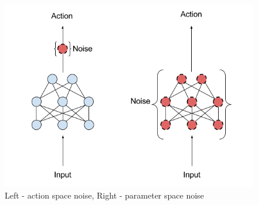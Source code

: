 \begin{figure}[H]
\centering
\includegraphics[scale=0.5]{fig/perturbations.png}
\caption{Left - action space noise, Right - parameter space noise}
\label{fig:exploration}
\end{figure}